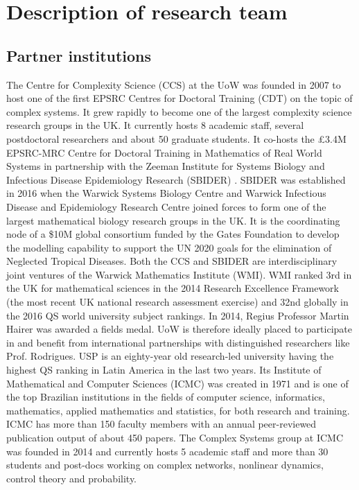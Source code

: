 \section{Description of research team}

\subsection{Partner institutions}
The {\hvnb Centre for Complexity Science (CCS)} at the UoW was founded in 2007 
to host one of the first EPSRC Centres for Doctoral Training (CDT) on the topic 
of complex systems. It grew rapidly to become one of the largest complexity 
science research groups in the UK. It currently hosts 8 academic staff, several 
postdoctoral researchers and about 50 graduate students. It co-hosts the 
\pounds 3.4M EPSRC-MRC Centre for Doctoral Training in Mathematics of Real 
World Systems in partnership with the {\hvnb Zeeman Institute for 
Systems Biology and Infectious Disease Epidemiology Research (SBIDER)} . SBIDER was 
established in 2016 when the Warwick Systems Biology Centre and Warwick 
Infectious Disease and Epidemiology Research Centre joined forces to form one 
of the largest mathematical biology research groups in the UK. It is the coordinating node of a 
\$10M global consortium funded by the Gates Foundation to develop the modelling 
capability to support the UN 2020 goals for the elimination of Neglected 
Tropical Diseases. Both the CCS and SBIDER are interdisciplinary joint ventures 
of the {\hvnb Warwick Mathematics Institute (WMI)}. WMI ranked 3rd in the UK for mathematical 
sciences in the 2014 Research Excellence Framework (the most recent UK national 
research assessment exercise) and 32nd globally in the 2016 QS world university 
subject rankings. In 2014, Regius Professor Martin Hairer was awarded a fields 
medal. UoW is therefore ideally placed to participate in and benefit from 
international partnerships with distinguished researchers like Prof. Rodrigues. 
USP is an eighty-year old research-led university having the highest QS ranking in Latin America in the 
last two years. Its {\hvnb Institute of  Mathematical and Computer Sciences (ICMC)} was created in 
1971 and is one of the top Brazilian institutions in the fields of computer science, informatics, 
mathematics, applied mathematics and statistics, for both research and training. ICMC has more than 
150 faculty members with an annual peer-reviewed publication output of about 450 papers. The 
Complex Systems group at ICMC was founded in 2014 and currently hosts 5 
academic staff and  more than 30 students and post-docs working on complex networks, nonlinear 
dynamics, control theory and probability.  

